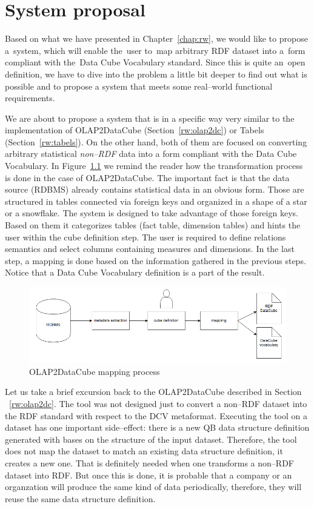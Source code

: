 \chapter{System proposal}
\label{ch:proposal}
Based on what we have presented in Chapter~\ref{chap:rw}, we would like to
propose a~system, which will enable the~user to~map arbitrary RDF dataset
into a~form compliant with the~Data Cube Vocabulary standard. Since this is 
quite an~open definition, we have to dive into the problem a little bit deeper to 
find out what is possible and to propose a system that meets some real--world 
functional requirements.

We are about to propose a system that is in a specific way very similar to 
the implementation of OLAP2DataCube (Section~\ref{rw:olap2dc}) or Tabels (Section~\ref{rw:tabels}).
On the other hand, both of them are 
focused on converting arbitrary statistical \emph{non--RDF} data into a form 
compliant with the Data Cube Vocabulary. In Figure~\ref{fig:olap2dc-mapping} we remind
the reader how the transformation process is done in the case of OLAP2DataCube.
The important fact is that the data source (RDBMS) already contains statistical data in an obvious form. 
Those are structured in tables connected via foreign keys and organized in a 
shape of a star or a snowflake. The system is designed to take advantage of those 
foreign keys. Based on them it categorizes tables (fact table, dimension tables) and hints
the user within the cube definition step.
The user is required to define relations semantics and select columns 
containing measures and dimensions. In the last step, a 
mapping is done based on the information gathered in the previous steps.
Notice that a Data Cube Vocabulary definition is a part of the result.


\begin{figure}
	\centering
	\includegraphics[width=140mm]{img/mapping-olap2dc.png}
	\caption{OLAP2DataCube mapping process}
	\label{fig:olap2dc-mapping}
\end{figure}


Let us take a brief excursion back to the OLAP2DataCube described in Section 
~\ref{rw:olap2dc}. The tool was not designed just to convert a non--RDF dataset 
into the RDF standard with respect to the DCV metaformat. Executing the tool on a 
dataset has one important side--effect: there is a new QB data structure definition
generated with bases on 
the structure of the input dataset. Therefore, the tool does not map the 
dataset to match an existing data structure definition, it creates a new one. That is definitely
needed when one transforms a non--RDF dataset into RDF. But once 
this is done, it is probable that a company or an organzation will produce the 
same kind of data periodically, therefore, they will reuse the same data structure definition.

